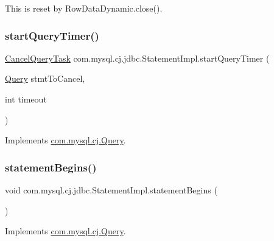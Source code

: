 This is reset by Row\+Data\+Dynamic.\+close(). \mbox{\label{classcom_1_1mysql_1_1cj_1_1jdbc_1_1_statement_impl_a0f8e090e92e82672734e247c080f7da7}} 
\subsubsection{\texorpdfstring{start\+Query\+Timer()}{startQueryTimer()}}
{\footnotesize\ttfamily \mbox{\hyperlink{interfacecom_1_1mysql_1_1cj_1_1_cancel_query_task}{Cancel\+Query\+Task}} com.\+mysql.\+cj.\+jdbc.\+Statement\+Impl.\+start\+Query\+Timer (\begin{DoxyParamCaption}\item[{\mbox{\hyperlink{interfacecom_1_1mysql_1_1cj_1_1_query}{Query}}}]{stmt\+To\+Cancel,  }\item[{int}]{timeout }\end{DoxyParamCaption})}



Implements \mbox{\hyperlink{interfacecom_1_1mysql_1_1cj_1_1_query_a05d5eedcc76ab8fe224f4e2df0e4d274}{com.\+mysql.\+cj.\+Query}}.

\mbox{\label{classcom_1_1mysql_1_1cj_1_1jdbc_1_1_statement_impl_a51c8920bf35fc909ec12c2755ee2c491}} 
\subsubsection{\texorpdfstring{statement\+Begins()}{statementBegins()}}
{\footnotesize\ttfamily void com.\+mysql.\+cj.\+jdbc.\+Statement\+Impl.\+statement\+Begins (\begin{DoxyParamCaption}{ }\end{DoxyParamCaption})}



Implements \mbox{\hyperlink{interfacecom_1_1mysql_1_1cj_1_1_query_a103f171654654e894600c59f324b651b}{com.\+mysql.\+cj.\+Query}}.


